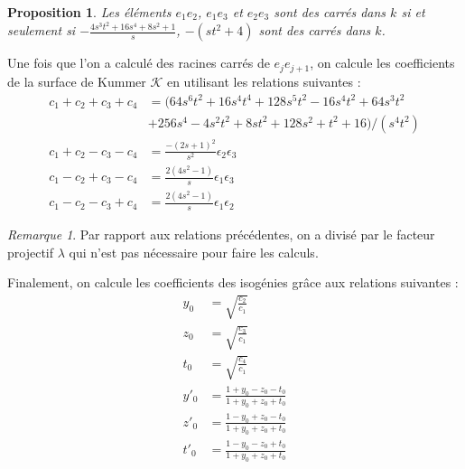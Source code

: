 \documentclass[a4paper]{article}
\newtheorem{proposition}[theoreme]{Proposition}
\theoremstyle{definition}
\theoremstyle{remark}
\newtheorem{remarque}{Remarque}
\numberwithin{equation}{section}
\begin{document}
\begin{proposition}
Les éléments $e_1e_2$, $e_1e_3$ et $e_2e_3$ sont des carrés dans $k$ si et seulement si
$-\frac{4s^3t^2 + 16s^4 + 8s^2 + 1}{s}$, $-(st^2+4)$ sont des carrés dans $k$.
\end{proposition}

Une fois que l'on a calculé des racines carrés de $e_je_{j+1}$, on calcule les coefficients de la surface de Kummer $\mathcal{K}$ en utilisant les relations suivantes :
\begin{align*}
c_1+c_2+c_3+c_4 &= (64s^6t^2 + 16s^4t^4 + 128s^5t^2 - 16s^4t^2 + 64s^3t^2 \\
				& + 256s^4 - 4s^2t^2 + 8st^2 + 128s^2 + t^2 + 16)/(s^4t^2) \\
c_1+c_2-c_3-c_4 &= \frac{-(2s + 1)^2}{s^2}\epsilon_2\epsilon_3 \\
c_1-c_2+c_3-c_4 &= \frac{2(4s^2 - 1)}{s}\epsilon_1\epsilon_3 \\
c_1-c_2-c_3+c_4 &= \frac{2(4s^2 - 1)}{s}\epsilon_1\epsilon_2
\end{align*}

\begin{remarque}
Par rapport aux relations précédentes, on a divisé par le facteur projectif $\lambda$ qui n'est pas nécessaire pour faire les calculs.
\end{remarque}

Finalement, on calcule les coefficients des isogénies grâce aux relations suivantes :
\begin{align*}
y_0 &= \sqrt{\frac{c_2}{c_1}} \\
z_0 &= \sqrt{\frac{c_3}{c_1}} \\
t_0 &= \sqrt{\frac{c_4}{c_1}} \\
y'_0 &= \frac{1+y_0-z_0-t_0}{1+y_0+z_0+t_0} \\
z'_0 &= \frac{1-y_0+z_0-t_0}{1+y_0+z_0+t_0} \\
t'_0 &= \frac{1-y_0-z_0+t_0}{1+y_0+z_0+t_0}
\end{align*}

\end{document}
